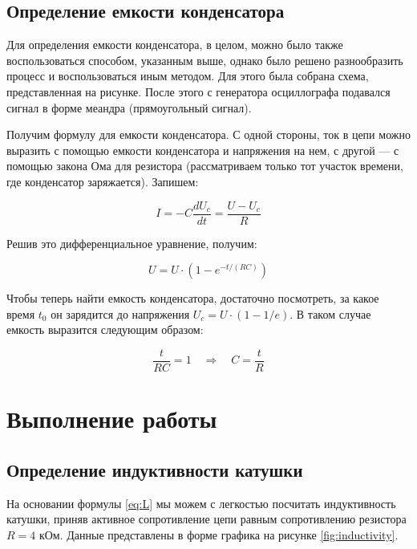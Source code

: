 \documentclass[a4paper, 12pt]{article}
\newcommand{\qrq}
{\ensuremath{\quad \Rightarrow \quad}} %
\begin{document}
\subsection{Определение емкости
	 конденсатора}

Для определения емкости конденсатора, в целом, можно было также воспользоваться способом, указанным выше, однако было решено разнообразить процесс и воспользоваться иным методом. Для этого была собрана схема, представленная на рисунке. %
После этого с генератора осциллографа подавался сигнал в форме меандра (прямоугольный сигнал).

Получим формулу для емкости конденсатора. С одной стороны, ток в цепи можно выразить с помощью емкости конденсатора и напряжения на нем, с другой --- с помощью закона Ома для резистора (рассматриваем только тот участок времени, где конденсатор заряжается). Запишем:

\begin{equation}
	\label{C_diff}
	I = - C \frac{d U_c}{d t} = \frac{U - U_c}{R}
\end{equation}

Решив это дифференциальное уравнение, получим:

\begin{equation}
	\label{U_condencator}
	U = U\cdot(1 - e^{-t / (RC)})
\end{equation}

Чтобы теперь найти емкость конденсатора, достаточно посмотреть, за какое время $t_0$ он зарядится до напряжения $U_c = U \cdot (1 - 1 / e)$. В таком случае емкость выразится следующим образом:

\begin{equation}
	\label{C_final}
	\frac{t}{RC} = 1 \qrq C = \frac{t}{R}
\end{equation}

\section{Выполнение работы}

\subsection{Определение индуктивности катушки}

На основании формулы \ref{eq:L} мы можем с легкостью посчитать индуктивность катушки, приняв активное сопротивление цепи равным сопротивлению резистора $R = 4$ кОм. Данные представлены в форме графика на рисунке \ref{fig:inductivity}.
\end{document}
